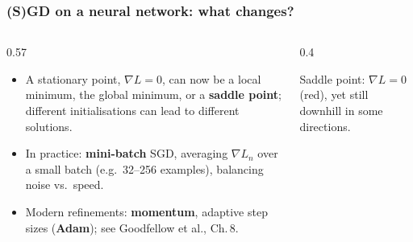 \documentclass[10pt]{beamer}
\begin{document}
\begin{frame}[fragile]
\frametitle{(S)GD on a neural network: what changes?}

\begin{columns}[c]
\begin{column}{0.57\textwidth}
\small
\begin{itemize}
\item A stationary point, $\nabla L = 0$, can now be a local minimum, the
  global minimum, or a \textbf{saddle point}; different initialisations can
  lead to different solutions.
\item In practice: \textbf{mini-batch} SGD, averaging $\nabla L_n$
  over a small batch (e.g.\ 32--256 examples), balancing noise vs.\
  speed.
\item[$\Rightarrow$] Modern refinements: \textbf{momentum}, adaptive
  step sizes (\textbf{Adam}); see Goodfellow et al., Ch.\,8.
\end{itemize}
\end{column}
\begin{column}{0.4\textwidth}
\centerline{}

\vspace{2pt}
{\scriptsize Saddle point: $\nabla L = 0$ (red), yet still downhill in
some directions.}
\end{column}
\end{columns}

\end{frame}
\end{document}
